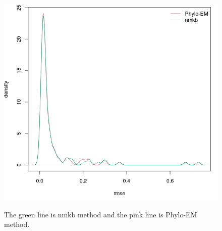 \begin{figure}[H]
     \begin{minipage}[t]{1\textwidth }
     \centering
     \includegraphics[width=\linewidth]{Fig7.png}
     {{The green line is nmkb method and the pink line is Phylo-EM method.}
     \par}
     \end{minipage}
\end{figure}

